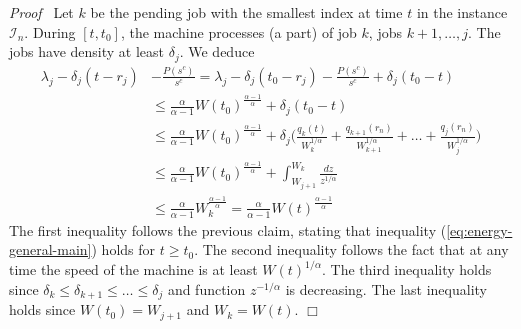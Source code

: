 \documentclass[11pt]{article}
\newenvironment{proof}{\noindent\emph{Proof\ }}{\hspace*{\fill}$\Box$\medskip}
\begin{document}
\begin{proof}
Let $k$ be the pending job with the smallest index at time $t$ 
in the instance $\mathcal{I}_{n}$. 
During $[t,t_{0}]$, the machine processes (a part) of job $k$, jobs $k+1,\ldots, j$.
The jobs have density at least $\delta_{j}$.
We deduce
\begin{align*}
\lambda_{j} - \delta_{j} (t-r_{j}) &- \frac{P(s^{c})}{s^{c}}
	= \lambda_{j} - \delta_{j} (t_{0}-r_{j}) -  \frac{P(s^{c})}{s^{c}}
			 + \delta_{j} (t_{0}-t) \\
&\leq \frac{\alpha}{\alpha-1} W(t_{0})^{\frac{\alpha-1}{\alpha}} + \delta_{j} (t_{0}-t) \\
&\leq \frac{\alpha}{\alpha-1} W(t_{0})^{\frac{\alpha-1}{\alpha}}
	+ \delta_{j} \biggl(  \frac{q_{k}(t)}{ W_{k}^{1/\alpha}} + 
		\frac{q_{k+1}(r_{n})}{ W_{k+1}^{1/\alpha}} + \ldots + 
		\frac{q_{j}(r_{n})}{ W_{j}^{1/\alpha}} \biggl)\\
&\leq \frac{\alpha}{\alpha-1} W(t_{0})^{\frac{\alpha-1}{\alpha}}
	 + \int_{W_{j+1}}^{W_{k}} \frac{dz}{z^{1/\alpha}} \\
&\leq \frac{\alpha}{\alpha-1} W_{k}^{\frac{\alpha-1}{\alpha}} 
	= \frac{\alpha}{\alpha-1} W(t)^{\frac{\alpha-1}{\alpha}}	
\end{align*}
The first inequality follows the previous claim, stating that inequality (\ref{eq:energy-general-main}) 
holds for $t \geq t_{0}$. The second inequality follows the fact that at any time the speed 
of the machine is at least $W(t)^{1/\alpha}$. The third inequality
holds since $\delta_{k} \leq \delta_{k+1} \leq \ldots \leq \delta_{j}$
and function $z^{-1/\alpha}$ is decreasing.
The last inequality holds since $W(t_{0}) = W_{j+1}$ and $W_{k} = W(t)$.
\end{proof}
\end{document}

